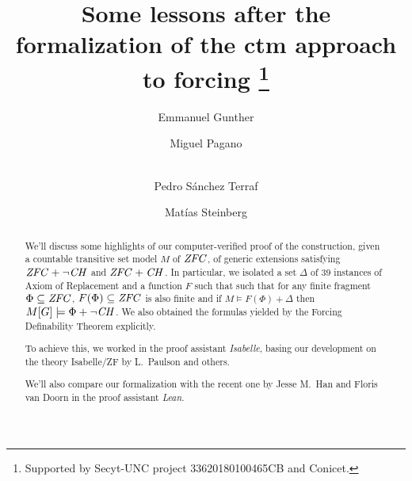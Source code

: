 \documentclass[runningheads]{llncs}
\begin{document}
%
\title{Some lessons after the formalization of the ctm approach to forcing%
  \thanks{Supported by Secyt-UNC project 33620180100465CB and Conicet.}%
}
%
%
\author{Emmanuel Gunther \and
Miguel Pagano \and \\
Pedro Sánchez Terraf%
\and
Matías Steinberg
}
%
%
%
\maketitle              %
%
\begin{abstract}
  We'll discuss some highlights of our computer-verified
  proof of the construction, given a countable transitive set model $M$
  of $\mathit{ZFC}$, of generic extensions  satisfying $\mathit{ZFC}+\neg\mathit{CH}$ and $\mathit{ZFC}+\mathit{CH}$.
  In particular,
  we isolated a set $\Delta$ of 39 instances
  of Axiom of Replacement and a function $F$
  such that such that for any finite fragment $\Phi\subseteq\mathit{ZFC}$,
  $F(\Phi)\subseteq\mathit{ZFC}$ is also finite and if
  $M\models F(\Phi) + \Delta$ then $M[G]\models \Phi + \neg \mathit{CH}$.
  We also obtained the formulas yielded by the Forcing Definability Theorem
  explicitly.

  To achieve this, we worked in the proof assistant \emph{Isabelle},
  basing our development on the theory Isabelle/ZF by L.~Paulson and
  others.


  We'll also compare our formalization with the recent one by Jesse
  M.~Han and Floris van Doorn in the proof assistant \emph{Lean}.

\end{abstract}
%
%
%

 
\end{document}
